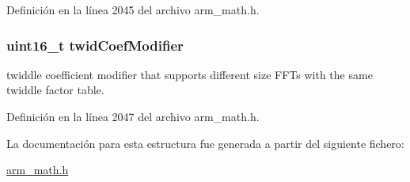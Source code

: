 Definición en la línea 2045 del archivo arm\+\_\+math.\+h.

\subsubsection[{\texorpdfstring{twid\+Coef\+Modifier}{twidCoefModifier}}]{\setlength{\rightskip}{0pt plus 5cm}uint16\+\_\+t twid\+Coef\+Modifier}\hypertarget{structarm__cfft__radix4__instance__q31_afe772e5b5001c9d8e85032115a8df5bf}{}\label{structarm__cfft__radix4__instance__q31_afe772e5b5001c9d8e85032115a8df5bf}
twiddle coefficient modifier that supports different size F\+F\+Ts with the same twiddle factor table. 

Definición en la línea 2047 del archivo arm\+\_\+math.\+h.



La documentación para esta estructura fue generada a partir del siguiente fichero\+:\begin{DoxyCompactItemize}
\item 
\hyperlink{arm__math_8h}{arm\+\_\+math.\+h}\end{DoxyCompactItemize}
